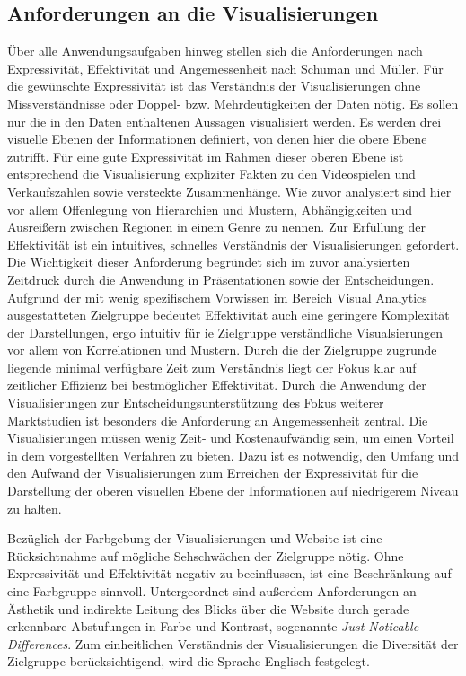 \documentclass[usegeometry=true]{scrartcl}
\begin{document}
\subsection{Anforderungen an die Visualisierungen}
Über alle Anwendungsaufgaben hinweg stellen sich die Anforderungen nach Expressivität, Effektivität und Angemessenheit nach Schuman und Müller.\cite[9ff.]{Schumann.2000}
Für die gewünschte Expressivität ist das Verständnis der Visualisierungen ohne Missverständnisse oder Doppel- bzw. Mehrdeutigkeiten der Daten nötig. 
Es sollen nur die in den Daten enthaltenen Aussagen visualisiert werden. 
Es werden drei visuelle Ebenen der Informationen definiert, von denen hier die obere Ebene zutrifft.\cite{Bertin.1982}
Für eine gute Expressivität im Rahmen dieser oberen Ebene ist entsprechend die Visualisierung expliziter Fakten zu den Videospielen und Verkaufszahlen sowie versteckte Zusammenhänge. 
Wie zuvor analysiert sind hier vor allem Offenlegung von Hierarchien und Mustern, Abhängigkeiten und Ausreißern zwischen Regionen in einem Genre zu nennen.
Zur Erfüllung der Effektivität ist ein intuitives, schnelles Verständnis der Visualisierungen gefordert.
Die Wichtigkeit dieser Anforderung begründet sich im zuvor analysierten Zeitdruck durch die Anwendung in Präsentationen sowie der Entscheidungen.
Aufgrund der mit wenig spezifischem Vorwissen im Bereich Visual Analytics ausgestatteten Zielgruppe bedeutet Effektivität auch eine geringere Komplexität der Darstellungen, ergo intuitiv für ie Zielgruppe verständliche Visualsierungen vor allem von Korrelationen und Mustern.
Durch die der Zielgruppe zugrunde liegende minimal verfügbare Zeit zum Verständnis liegt der Fokus klar auf zeitlicher Effizienz bei bestmöglicher Effektivität.
Durch die Anwendung der Visualisierungen zur Entscheidungsunterstützung des Fokus weiterer Marktstudien ist besonders die Anforderung an Angemessenheit zentral. 
Die Visualisierungen müssen wenig Zeit- und Kostenaufwändig sein, um einen Vorteil in dem vorgestellten Verfahren zu bieten. 
Dazu ist es notwendig, den Umfang und den Aufwand der Visualisierungen zum Erreichen der Expressivität für die Darstellung der oberen visuellen Ebene der Informationen auf niedrigerem Niveau zu halten.

Bezüglich der Farbgebung der Visualisierungen und Website ist eine Rücksichtnahme auf mögliche Sehschwächen der Zielgruppe nötig. 
Ohne Expressivität und Effektivität negativ zu beeinflussen, ist eine Beschränkung auf eine Farbgruppe sinnvoll. 
Untergeordnet sind außerdem Anforderungen an Ästhetik und indirekte Leitung des Blicks über die Website durch gerade erkennbare Abstufungen in Farbe und Kontrast, sogenannte \textit{Just Noticable Differences}.
Zum einheitlichen Verständnis der Visualisierungen die Diversität der Zielgruppe berücksichtigend, wird die Sprache Englisch festgelegt.
\end{document}
